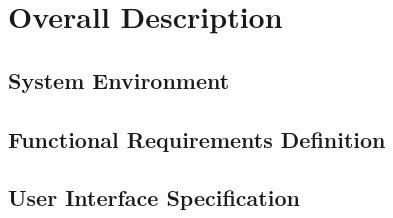 \section{Overall Description}
\subsection{System Environment}
\subsection{Functional Requirements Definition}
\subsection{User Interface Specification}

